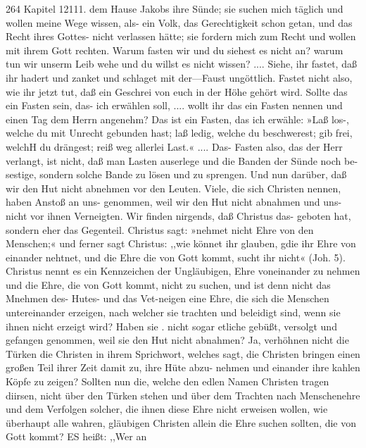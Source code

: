 264 Kapitel 12111.
dem Hause Jakobs ihre Sünde; sie suchen mich täglich und wollen
meine Wege wissen, als- ein Volk, das Gerechtigkeit schon getan,
und das Recht ihres Gottes- nicht verlassen hätte; sie fordern
mich zum Recht und wollen mit ihrem Gott rechten. Warum
fasten wir und du siehest es nicht an? warum tun wir unserm
Leib wehe und du willst es nicht wissen? .... Siehe, ihr fastet,
daß ihr hadert und zanket und schlaget mit der—Faust ungöttlich.
Fastet nicht also, wie ihr jetzt tut, daß ein Geschrei von euch
in der Höhe gehört wird. Sollte das ein Fasten sein, das- ich
erwählen soll, .... wollt ihr das ein Fasten nennen und einen
Tag dem Herrn angenehm? Das ist ein Fasten, das ich erwähle:
»Laß los-, welche du mit Unrecht gebunden hast; laß ledig, welche
du beschwerest; gib frei, welchH du drängest; reiß weg allerlei
Last.« .... Das- Fasten also, das der Herr verlangt, ist nicht,
daß man Lasten auserlege und die Banden der Sünde noch be-
sestige, sondern solche Bande zu lösen und zu sprengen.
Und nun darüber, daß wir den Hut nicht abnehmen vor den
Leuten. Viele, die sich Christen nennen, haben Anstoß an uns-
genommen, weil wir den Hut nicht abnahmen und uns- nicht vor
ihnen Verneigten. Wir finden nirgends, daß Christus das- geboten
hat, sondern eher das Gegenteil. Christus sagt: »nehmet nicht
Ehre von den Menschen;« und ferner sagt Christus: ,,wie könnet
ihr glauben, gdie ihr Ehre von einander nehtnet, und die Ehre
die von Gott kommt, sucht ihr nicht« (Joh. 5). Christus nennt
es ein Kennzeichen der Ungläubigen, Ehre voneinander zu nehmen
und die Ehre, die von Gott kommt, nicht zu suchen, und ist denn
nicht das Mnehmen des- Hutes- und das Vet-neigen eine Ehre, die
sich die Menschen untereinander erzeigen, nach welcher sie trachten
und beleidigt sind, wenn sie ihnen nicht erzeigt wird? Haben sie .
nicht sogar etliche gebüßt, versolgt und gefangen genommen, weil
sie den Hut nicht abnahmen? Ja, verhöhnen nicht die Türken
die Christen in ihrem Sprichwort, welches sagt, die Christen
bringen einen großen Teil ihrer Zeit damit zu, ihre Hüte abzu-
nehmen und einander ihre kahlen Köpfe zu zeigen? Sollten nun
die, welche den edlen Namen Christen tragen diirsen, nicht über
den Türken stehen und über dem Trachten nach Menschenehre
und dem Verfolgen solcher, die ihnen diese Ehre nicht erweisen
wollen, wie überhaupt alle wahren, gläubigen Christen allein die
Ehre suchen sollten, die von Gott kommt? ES heißt: ,,Wer an


